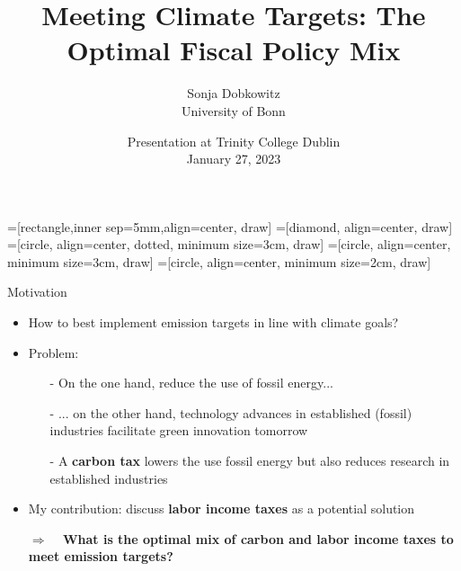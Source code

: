\documentclass[11pt,aspectratio=169]{beamer}
\author[Sonja Dobkowitz]{\small Sonja Dobkowitz\\ \footnotesize{University of Bonn%
}\\ }
\title{Meeting Climate Targets: The Optimal Fiscal Policy Mix}
\date{\small{Presentation at Trinity College Dublin\\ January 27, 2023 }}
\newcommand{\ar}{$\Rightarrow$ \ }
\begin{document}
=[rectangle,inner sep=5mm,align=center, draw]
=[diamond, align=center, draw]
=[circle, align=center, dotted, minimum size=3cm, draw]
=[circle, align=center, minimum size=3cm, draw]
=[circle, align=center, minimum size=2cm, draw]
{
	\begin{frame}
		\titlepage
	\end{frame}
}



\addtocounter{framenumber}{-1}
\begin{frame}{Motivation}
	\begin{itemize}[<+-| alert@+>]
		\item How to best implement emission targets in line with climate goals? %
		\vspace{3mm}
		\item Problem:
		\begin{itemize}
			\item[-] On the one hand, reduce the use of fossil energy...
			\vspace{2mm}
			\item[-] ... on the other hand, technology advances in established (fossil) industries facilitate green innovation tomorrow
			\vspace{2mm}				
			\item[-] A \textbf{carbon tax} lowers the use fossil energy but also reduces research in established industries %
		\end{itemize} 
		\vspace{3mm}
		\item My contribution: discuss \textbf{labor income taxes} as a potential solution
		\vspace{3mm}
		\item[\alert{\ar}] \alert{\textbf{What is the optimal mix of carbon and labor income taxes to meet emission targets?}}
	\end{itemize}
\end{frame}
\end{document}
